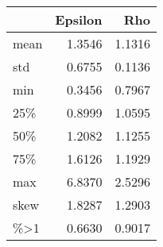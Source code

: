 \begin{tabular}{lrr}
\toprule
{} &  Epsilon &     Rho \\
\midrule
mean &   1.3546 &  1.1316 \\
std  &   0.6755 &  0.1136 \\
min  &   0.3456 &  0.7967 \\
25\%  &   0.8999 &  1.0595 \\
50\%  &   1.2082 &  1.1255 \\
75\%  &   1.6126 &  1.1929 \\
max  &   6.8370 &  2.5296 \\
skew &   1.8287 &  1.2903 \\
\%>1  &   0.6630 &  0.9017 \\
\bottomrule
\end{tabular}
